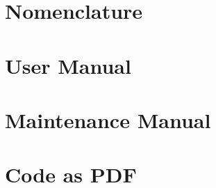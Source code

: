 \documentclass[11pt]{report}
\begin{document}
  \begin{appendices}
    \chapter{Nomenclature}
    \label{cha:glossary}
    
      
    
    \chapter{User Manual}
    \label{cha:user}
      
      
    
    \chapter{Maintenance Manual}
    \label{cha:maint}
    
      
    
    \chapter{Code as PDF}
    \label{cha:code}
    
    \clearpage
    \nocite{*} %
    
  \end{appendices}
\end{document}

